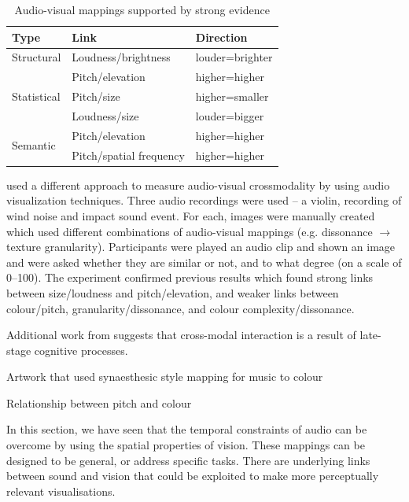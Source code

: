 \begin{table}
\centering
\begin{tabular}{|l|l|l|}
\hline
\textbf{Type} & \textbf{Link} & \textbf{Direction} \\ \hline
Structural    & Loudness/brightness  & louder=brighter \\ \hline
\multirow{3}{*}{Statistical} & Pitch/elevation & higher=higher \\ \cline{2-3}
              & Pitch/size & higher=smaller \\ \cline{2-3}
              & Loudness/size & louder=bigger \\ \hline
\multirow{2}{*}{Semantic} & Pitch/elevation & higher=higher \\ \cline{2-3}
              & Pitch/spatial frequency & higher=higher \\ \hline
\end{tabular}
\caption{Audio-visual mappings supported by strong evidence \citep{Spence2011}}
\label{tab:crossmodal}
\end{table}

\citet{Tsiros2014} used a different approach to measure audio-visual crossmodality by using audio visualization
techniques.  Three audio recordings were used -- a violin, recording of wind noise and impact sound event. For each,
images were manually created which used different combinations of audio-visual mappings (e.g. dissonance $\to$ texture
granularity). Participants were played an audio clip and shown an image and were asked whether they are similar or not,
and to what degree (on a scale of 0--100).  The experiment confirmed previous results which found strong links between
size/loudness and pitch/elevation, and weaker links between colour/pitch, granularity/dissonance, and colour
complexity/dissonance.

Additional work from \citet{Marks2003} suggests that cross-modal interaction is a result of late-stage cognitive
processes.

Artwork that used synaesthesic style mapping for music to colour \citep{Armitage2012}

Relationship between pitch and colour \citep{Datteri2004}


In this section, we have seen that the temporal constraints of audio can be overcome by using the spatial properties of
vision. These mappings can be designed to be general, or address specific tasks. There are underlying links between
sound and vision that could be exploited to make more perceptually relevant visualisations.

